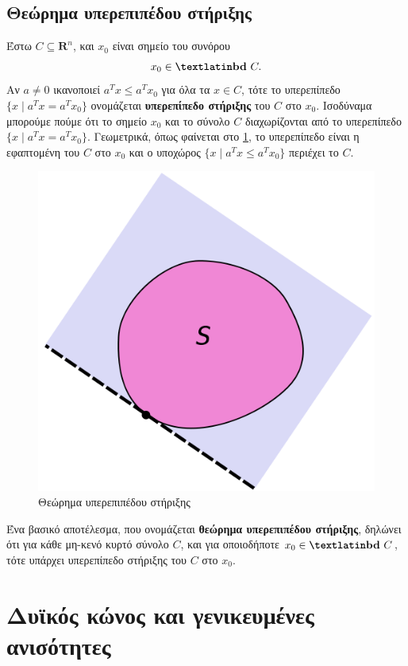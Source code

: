 \subsection{Θεώρημα υπερεπιπέδου στήριξης} Έστω $C \subseteq \mathbf{R}^n$,
και $x_0$ είναι σημείο του συνόρου
\begin{equation*}
    x_0 \in \textbf{\tl{bd}}\ C.
\end{equation*}
Αν $a \neq 0$ ικανοποιεί $a^Tx \leq a^Tx_0$ για όλα τα $x \in C$, τότε το
υπερεπίπεδο $\{x \mid a^Tx = a^Tx_0\}$ ονομάζεται \textbf{υπερεπίπεδο στήριξης}
του $C$ στο $x_0$. Ισοδύναμα μπορούμε πούμε ότι το σημείο $x_0$ και το σύνολο
$C$ διαχωρίζονται από το υπερεπίπεδο $\{x\mid a^Tx = a^T x_0\}$. Γεωμετρικά,
όπως φαίνεται στο \ref{fig:supporting_theorem}, το υπερεπίπεδο είναι η εφαπτομένη του $C$ στο $x_0$ και ο
υποχώρος $\{x \mid a^Tx \leq a^Tx_0\}$ περιέχει το $C$.
\begin{figure}[h]
    \centering
    \includegraphics[scale=0.3]{figures/Supporting_hyperplane1.png}
    \caption{Θεώρημα υπερεπιπέδου στήριξης}
    \label{fig:supporting_theorem}
\end{figure}
Ένα βασικό αποτέλεσμα, που ονομάζεται \textbf{θεώρημα υπερεπιπέδου στήριξης},
δηλώνει ότι για κάθε μη-κενό κυρτό σύνολο $C$, και για οποιοδήποτε $x_0 \in
\textbf{\tl{bd}}\ C$, τότε υπάρχει υπερεπίπεδο στήριξης του $C$ στο $x_0$.

\section{Δυϊκός κώνος και γενικευμένες ανισότητες}

